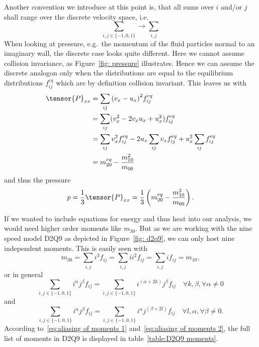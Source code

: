 Another convention we introduce at this point is, that all sums over $i$ and/or $j$ shall range over the discrete velocity space, i.e.
\begin{equation*}
  \sum_{i,j \in \{-1,0,1\}} \rightarrow \sum_{i,j}
\end{equation*}
When looking at pressure, e.g.\ the momentum of the fluid particles normal to an imaginary wall, the discrete case looks quite different.
Here we cannot assume collision invariance, as Figure~\ref{fig: pressure} illustrates.
Hence we can assume the discrete analogon only when the distributions are equal to the equilibrium distributions $f_{ij}^{eq}$ which are by definition collision invariant.
This leaves us with
\begin{equation}
  \begin{aligned}
    \tensor{P}_{xx}
    & = \sum_{ij} {(v_x - u_x)}^2 f_{ij}^{eq}
    \\ & =
    \sum_{ij} (v_x^2 - 2v_x u_x + u_x^2) f_{ij}^{eq}
    \\ & =
    \sum_{ij} v_x^2 f_{ij}^{eq} - 2 u_x \sum_{ij} v_x f_{ij}^{eq} + u_x^2 \sum_{ij}f_{ij}^{eq}
    \\ & = m_{20}^{eq} - \frac{m_{10}^2}{m_{00}}
  \end{aligned}
\end{equation}
and thus the pressure
\begin{equation}
  p=\frac{1}{3} \tensor{P}_{xx} = \frac{1}{3} \left(m_{20}^{eq} - \frac{m_{10}^2}{m_{00}}\right).
\end{equation}

If we wanted to include equations for energy and thus heat into our analysis, we would need higher order moments like $m_{30}$.
But as we are working with the nine speed model D2Q9 as depicted in Figure~\ref{fig: d2q9}, we can only host nine independent moments.
This is easily seen with
\begin{equation}
  m_{30} = \sum_{i,j} i^3 f_{ij} = \sum_{i,j} i i^2 f_{ij} = \sum_{i,j} i f_{ij} = m_{10},
\end{equation}
or in general
\begin{equation}
  \label{eq:aliasing of moments 1}
  \sum_{i,j \in \{-1,0,1\}} i^\alpha j^\beta f_{ij} = \sum_{i,j \in \{-1,0,1\}} i^{(\alpha+2k)} j^\beta f_{ij} \quad \forall k,\beta, \forall \alpha \neq 0
\end{equation}
and
\begin{equation}
  \label{eq:aliasing of moments 2}
  \sum_{i,j \in \{-1,0,1\}} i^\alpha j^\beta f_{ij} = \sum_{i,j \in \{-1,0,1\}} i^\alpha j^{(\beta+2l)} f_{ij} \quad \forall l, \alpha, \forall \beta \neq 0.
\end{equation}
According to~\eqref{eq:aliasing of moments 1} and~\eqref{eq:aliasing of moments 2}, the full list of moments in D2Q9 is displayed in table~\ref{table:D2Q9 moments}.

